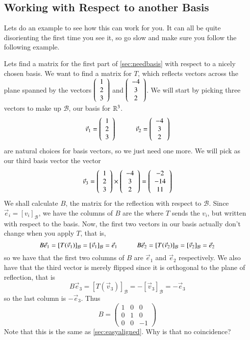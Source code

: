 \documentclass[Main.tex]{subfiles}
\begin{document}
\subsection{Working with Respect to another Basis}

Lets do an example to see how this can work for you.
It can all be quite disorienting the first time you see it, so go slow and make sure you follow the following example.  
\begin{Example}
  Lets find a matrix for the first part of \ref{sec:needbasis} with respect to a nicely chosen basis.  
  We want to find a matrix for $T$, which reflects vectors across the plane spanned by the vectors $\left(\begin{array}{c}1\\2\\3\\\end{array}\right)$ and $\left(\begin{array}{c}-4\\3\\2\end{array}\right)$.
  We will start by picking three vectors to make up $\mathcal{B}$, our basis for $\mathbb{R}^3$.  
  \[\vec{v}_1=\vect{1\\2\\3\\}\hspace{10mm}\vec{v}_2=\vect{-4\\3\\2}\]
  are natural choices for basis vectors, so we just need one more.  
  We will pick as our third basis vector the vector
  \[\vec{v}_3=\left(\begin{array}{c}1\\2\\3\\\end{array}\right)\times\left(\begin{array}{c}-4\\3\\2\end{array}\right) = \left(\begin{array}{c}-2\\-14\\11\end{array}\right)\]
  We shall calculate $B$, the matrix for the reflection with respect to $\mathcal{B}$.  
  Since $\vec{e}_i=[v_i]_\mathcal{B}$, we have the columns of $B$ are the where $T$ sends the $v_i$, but written with respect to the basis.
  Now, the first two vectors in our basis actually don't change when you apply $T$, that is,
  \[B\vec{e}_1=[T(\vec{v}_1)]_\mathcal{B}=[\vec{v}_1]_\mathcal{B}= \vec{e}_1\hspace{10mm}B\vec{e}_2=[T(\vec{v}_2)]_\mathcal{B}=[\vec{v}_2]_\mathcal{B}= \vec{e}_2\]
  so we have that the first two columns of $B$ are $\vec{e}_1$ and $\vec{e}_2$ respectively.
  We also have that the third vector is merely flipped since it is orthogonal to the plane of reflection, that is
  \[B\vec{e}_3=[T(\vec{v}_3)]_\mathcal{B}=-[\vec{v}_3]_\mathcal{B}= -\vec{e}_3\]
  so the last column is $-\vec{e}_3$.
  Thus
  \[B=\left(\begin{array}{ccc}1 & 0 & 0\\ 0 & 1 & 0 \\ 0 & 0 & -1\end{array}\right)\]
  Note that this is the same as \ref{sec:easyaligned}.  Why is that no coincidence?
\end{Example}
\end{document}
